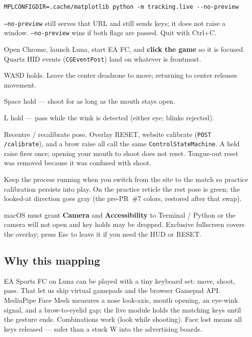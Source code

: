 \documentclass[11pt]{article}
\begin{document}
\begin{verbatim}
MPLCONFIGDIR=.cache/matplotlib python -m tracking.live --no-preview
\end{verbatim}

\texttt{--no-preview} still serves that URL and still sends keys; it does
not raise a window. \texttt{--no-preview} wins if both flags are passed.
Quit with Ctrl+C.

Open Chrome, launch Luna, start EA FC, and \textbf{click the game} so it is
focused. Quartz HID events (\texttt{CGEventPost}) land on whatever is
frontmost.

\begin{description}[style=nextline,leftmargin=1.5em]
  \item[Look / head (nose joystick)]
    WASD holds. Leave the center deadzone to move; returning to center
    releases movement.
  \item[Mouth open]
    Space hold --- shoot for as long as the mouth stays open.
  \item[Wink]
    L hold --- pass while the wink is detected (either eye; blinks
    rejected).
  \item[Raised eyebrows]
    Recentre / recalibrate pose. Overlay RESET, website calibrate
    (\texttt{POST /calibrate}), and a brow raise all call the same
    \texttt{ControlStateMachine}. A held raise fires once; opening your
    mouth to shoot does not reset. Tongue-out reset was removed because it
    was confused with shoot.
\end{description}

Keep the process running when you switch from the site to the match so
practice calibration persists into play. On the practice reticle the rest
pose is green; the looked-at direction goes gray (the pre-PR~\#7 colors,
restored after that swap).

macOS must grant \textbf{Camera} and \textbf{Accessibility} to Terminal /
Python or the camera will not open and key holds may be dropped. Exclusive
fullscreen covers the overlay; press Esc to leave it if you need the HUD or
RESET.

\subsection*{Why this mapping}

EA Sports FC on Luna can be played with a tiny keyboard set: move, shoot,
pass. That let us skip virtual gamepads and the browser Gamepad API.
MediaPipe Face Mesh measures a nose look-axis, mouth opening, an eye-wink
signal, and a brow-to-eyelid gap; the live module holds the matching keys
until the gesture ends. Combinations work (look while shooting). Face lost
means all keys released --- safer than a stuck W into the advertising
boards.
\end{document}
